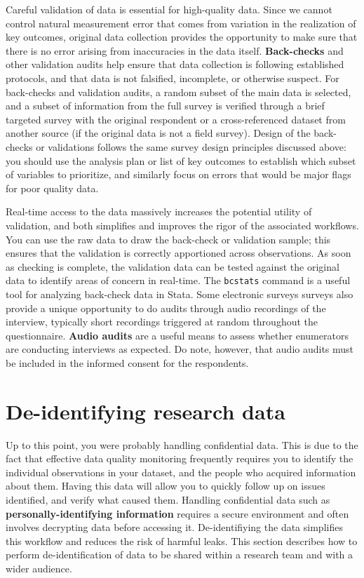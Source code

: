 Careful validation of data is essential for high-quality data.
Since we cannot control natural measurement error
that comes from variation in the realization of key outcomes,
original data collection provides the opportunity to make sure
that there is no error arising from inaccuracies in the data itself.
\textbf{Back-checks} and
other validation audits help ensure that data collection is following established protocols,
and that data is not falsified, incomplete, or otherwise suspect.
For back-checks and validation audits, a random subset of the main data is selected,
and a subset of information from the full survey is
verified through a brief targeted survey with the original respondent
or a cross-referenced dataset from another source (if the original data is not a field survey).
Design of the back-checks or validations follows the same survey design
principles discussed above: you should use the analysis plan
or list of key outcomes to establish which subset of variables to prioritize,
and similarly focus on errors that would be major flags for poor quality data.

Real-time access to the data massively increases the potential utility of validation,
and both simplifies and improves the rigor of the associated workflows.
You can use the raw data to draw the back-check or validation sample;
this ensures that the validation is correctly apportioned across observations.
As soon as checking is complete, the validation data can be tested against
the original data to identify areas of concern in real-time.
The \texttt{bcstats} command is a useful tool for analyzing back-check data in Stata.
Some electronic surveys surveys also provide a unique opportunity
to do audits through audio recordings of the interview,
typically short recordings triggered at random throughout the questionnaire.
\textbf{Audio audits} are a useful means to assess whether enumerators are conducting interviews as expected.
Do note, however, that audio audits must be included in the informed consent for the respondents.


\section{De-identifying research data}

Up to this point, you were probably handling confidential data.
This is due to the fact that effective data quality monitoring
frequently requires you to identify the individual observations in your dataset,
and the people who acquired information about them.
Having this data will allow you to quickly follow up on issues identified,
and verify what caused them.
Handling confidential data such as \textbf{personally-identifying information}
requires a secure environment and often involves
decrypting data before accessing it.
De-identifiying the data simplifies this workflow and reduces the risk of harmful leaks.
This section describes how to perform de-identification of data 
to be shared within a research team and with a wider audience.

